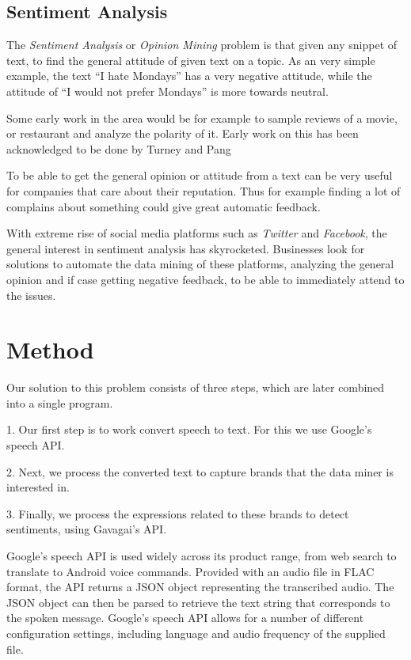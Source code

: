 \documentclass[a4paper,12pt,twoside]{ltxdoc}
\begin{document}
\subsection{Sentiment Analysis}
The \emph{Sentiment Analysis} or \emph{Opinion Mining} problem is that given any snippet of text,
to find the general attitude of given text on a topic.
As an very simple example, the text ``I hate Mondays'' has a very negative attitude,
while the attitude of ``I would not prefer Mondays'' is more towards neutral.

Some early work in the area would be for example to sample reviews of a movie, or restaurant and analyze the polarity of it. Early work on this has been acknowledged to be done by Turney\cite{turney} and Pang\cite{pang}

To be able to get the general opinion or attitude from a text can be very useful for companies that care about their reputation.
Thus for example finding a lot of complains about something could give great automatic feedback.

With extreme rise of social media platforms such as \emph{Twitter} and \emph{Facebook}, the general interest in sentiment analysis has skyrocketed. Businesses look for solutions to automate the data mining of these platforms, analyzing the general opinion and if case getting negative feedback, to be able to immediately attend to the issues.

\section{Method}

Our solution to this problem consists of three steps, which are later combined into a single program.

1. Our first step is to work convert speech to text. For this we use Google's speech API.

2. Next, we process the converted text to capture brands that the data miner is interested in.

3. Finally, we process the expressions related to these brands to detect sentiments, using Gavagai's API.

Google's speech API is used widely across its product range, from web search to translate to Android voice commands.
Provided with an audio file in FLAC format, the API returns a JSON object representing the transcribed audio. The JSON object
can then be parsed to retrieve the text string that corresponds to the spoken message. Google's speech API allows for a number
of different configuration settings, including language and audio frequency of the supplied file.
\end{document}
